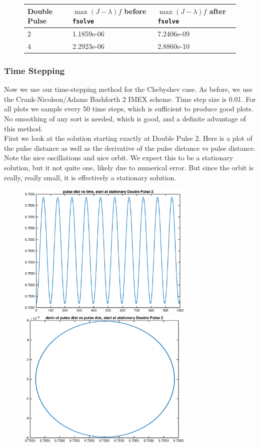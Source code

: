 \documentclass[12pt]{article}
\begin{document}
\begin{figure}[H]
\begin{tabular}{l|ll}
  Double Pulse  &  $\max (J -\lambda )f$ before \texttt{fsolve}  &  $\max (J -\lambda) f$ after \texttt{fsolve} \\ \hline
  2   &     1.1859e-06 &   7.2406e-09   \\ 
  4   &     2.2923e-06 &   2.8860e-10   \\ 
\end{tabular}
\end{figure}

\subsubsection*{Time Stepping}

Now we use our time-stepping method for the Chebyshev case. As before, we use the Crank-Nicolson/Adams Bashforth 2 IMEX scheme. Time step size is 0.01. For all plots we sample every 50 time steps, which is sufficient to produce good plots. No smoothing of any sort is needed, which is good, and a definite advantage of this method. \\

First we look at the solution starting exactly at Double Pulse 2. Here is a plot of the pulse distance as well as the derivative of the pulse distance vs pulse distance. Note the nice oscillations and nice orbit. We expect this to be a stationary solution, but it not quite one, likely due to numerical error. But since the orbit is really, really small, it is effectively a stationary solution.

\begin{figure}[H]
	\includegraphics[width=8.5cm]{stat1a_dist}
	\includegraphics[width=8.5cm]{stat1a_orbit}
\end{figure}
\end{document}
